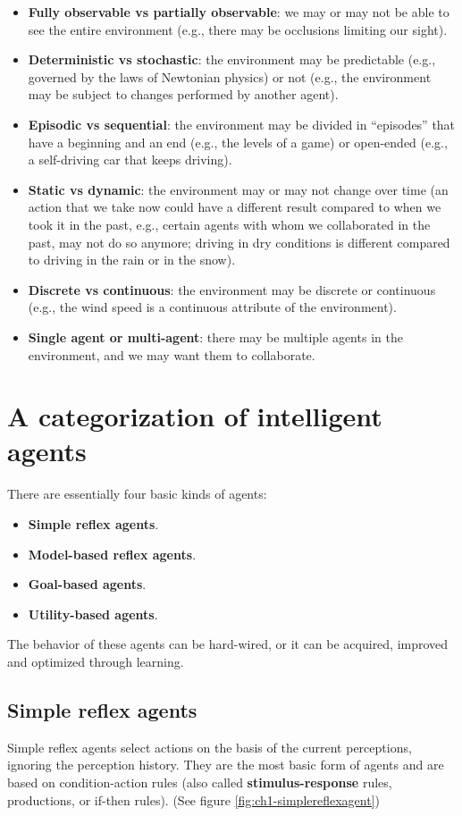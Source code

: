 \begin{itemize}
    \item \textbf{Fully observable vs partially observable}: we may or may not be able to see the entire environment (e.g., there may be occlusions limiting our sight).
    \item \textbf{Deterministic vs stochastic}: the environment may be predictable (e.g., governed by the laws of Newtonian physics) or not (e.g., the environment may be subject to changes performed by another agent).
    \item \textbf{Episodic vs sequential}: the environment may be divided in “episodes” that have a beginning and an end (e.g., the levels of a game) or open-ended (e.g., a self-driving car that keeps driving).
    \item \textbf{Static vs dynamic}: the environment may or may not change over time (an action that we take now could have a different result compared to when we took it in the past, e.g., certain agents with whom we collaborated in the past, may not do so anymore; driving in dry conditions is different compared to driving in the rain or in the snow).
    \item \textbf{Discrete vs continuous}: the environment may be discrete or continuous (e.g., the wind speed is a continuous attribute of the environment).
    \item \textbf{Single agent or multi-agent}: there may be multiple agents in the environment, and we may want them to collaborate.
\end{itemize}

\section{A categorization of intelligent agents}
There are essentially four basic kinds of agents:

\begin{itemize}
    \item \textbf{Simple reflex agents}.
    \item \textbf{Model-based reflex agents}.
    \item \textbf{Goal-based agents}.
    \item \textbf{Utility-based agents}.
\end{itemize}

The behavior of these agents can be hard-wired, or it can be acquired, improved and optimized through learning.

\subsection{Simple reflex agents}
Simple reflex agents select actions on the basis of the current perceptions, ignoring the perception history. They are the most basic form of agents and are based on condition-action rules (also called \textbf{stimulus-response} rules, productions, or if-then rules). (See figure \ref{fig:ch1-simplereflexagent})

